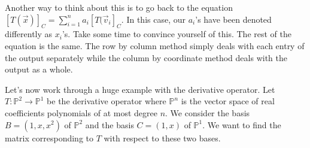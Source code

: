 Another way to think about this is to go back to the equation $[T(\vec{x})]_C=\sum_{i=1}^n a_i[T(\vec{v}_i]_C$. In this case, our $a_i$'s have been denoted differently as $x_i$'s. Take some time to convince yourself of this. The rest of the equation is the same. The row by column method simply deals with each entry of the output separately while the column by coordinate method deals with the output as a whole.

\begin{example}
    Let's now work through a huge example with the derivative operator. Let $T:\mathbb{P}^2\to \mathbb{P}^1$ be the derivative operator where $\mathbb{P}^n$ is the vector space of real coefficients polynomials of at most degree $n$. We consider the basis $B=(1,x,x^2)$ of $\mathbb{P}^2$ and the basis $C=(1,x)$ of $\mathbb{P}^1$. We want to find the matrix corresponding to $T$ with respect to these two bases.


\end{example}

